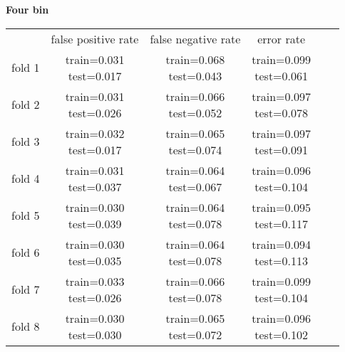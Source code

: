 \documentclass[12pt]{article}
\begin{document}
\clearpage
\textbf{Four bin} \\
\begin{tabular}{ r|c|c|c|c|c| } \multicolumn{1}{r}{}
& \multicolumn{1}{c}{false positive rate}
& \multicolumn{1}{c}{false negative rate}
& \multicolumn{1}{c}{error rate} \\
\cline{2-4}
fold 1 & \shortstack{train=0.031 \\ test=0.017}& \shortstack{train=0.068 \\ test=0.043}& \shortstack{train=0.099 \\ test=0.061} \\\cline{2-4}
fold 2 & \shortstack{train=0.031 \\ test=0.026}& \shortstack{train=0.066 \\ test=0.052}& \shortstack{train=0.097 \\ test=0.078} \\\cline{2-4}
fold 3 & \shortstack{train=0.032 \\ test=0.017}& \shortstack{train=0.065 \\ test=0.074}& \shortstack{train=0.097 \\ test=0.091} \\\cline{2-4}
fold 4 & \shortstack{train=0.031 \\ test=0.037}& \shortstack{train=0.064 \\ test=0.067}& \shortstack{train=0.096 \\ test=0.104} \\\cline{2-4}
fold 5 & \shortstack{train=0.030 \\ test=0.039}& \shortstack{train=0.064 \\ test=0.078}& \shortstack{train=0.095 \\ test=0.117} \\\cline{2-4}
fold 6 & \shortstack{train=0.030 \\ test=0.035}& \shortstack{train=0.064 \\ test=0.078}& \shortstack{train=0.094 \\ test=0.113} \\\cline{2-4}
fold 7 & \shortstack{train=0.033 \\ test=0.026}& \shortstack{train=0.066 \\ test=0.078}& \shortstack{train=0.099 \\ test=0.104} \\\cline{2-4}
fold 8 & \shortstack{train=0.030 \\ test=0.030}& \shortstack{train=0.065 \\ test=0.072}& \shortstack{train=0.096 \\ test=0.102} \\\cline{2-4}

\end{tabular}
\end{document}
